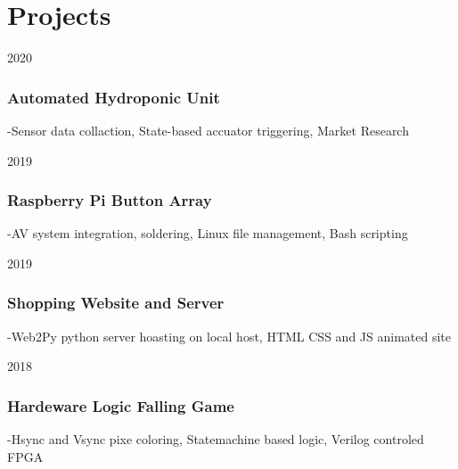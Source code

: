 \documentclass[12pt,letterpaper]{report}
\newcommand{\verticalgap}{2em}
\newcommand{\projectspace}{.3em}
\newcommand{\topandbottom}{\linewidth}
\begin{document}
	\begin{minipage}[t]{\topandbottom}
		\vspace{\verticalgap}
	\section*{Projects}
    \begin{tablist}
	\raggedright
	\item[2020] \tab \subsubsection*{Automated Hydroponic Unit}\hspace{\projectspace}-Sensor data collaction, State-based accuator triggering, Market Research
    \item[2019] \tab \subsubsection*{Raspberry Pi Button Array}\hspace{\projectspace}-AV system integration, soldering, Linux file management, Bash scripting
    \item[2019] \tab \subsubsection*{Shopping Website and Server}\hspace{\projectspace}-Web2Py python server hoasting on local host, HTML CSS and JS animated site
    \item[2018] \tab \subsubsection*{Hardeware Logic Falling Game}\hspace{\projectspace}-Hsync and Vsync pixe coloring, Statemachine based logic, Verilog controled FPGA
	\end{tablist}
	\end{minipage}
	
\end{document}
